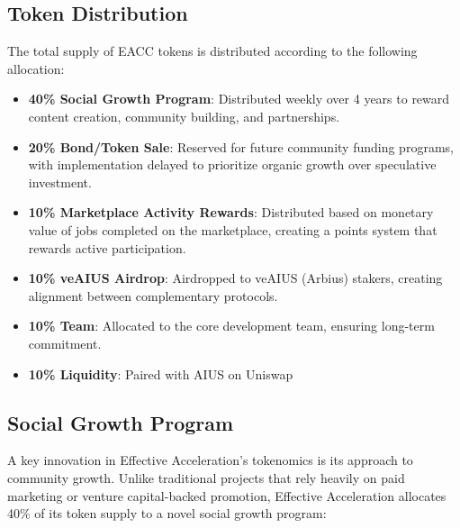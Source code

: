 \documentclass{article}
\begin{document}
\subsection{Token Distribution}

The total supply of EACC tokens is distributed according to the following allocation:

\begin{itemize}
    \item \textbf{40\% Social Growth Program}: Distributed weekly over 4 years to reward content creation, community building, and partnerships.
    
    \item \textbf{20\% Bond/Token Sale}: Reserved for future community funding programs, with implementation delayed to prioritize organic growth over speculative investment.
    
    \item \textbf{10\% Marketplace Activity Rewards}: Distributed based on monetary value of jobs completed on the marketplace, creating a points system that rewards active participation.
    
    \item \textbf{10\% veAIUS Airdrop}: Airdropped to veAIUS (Arbius) stakers, creating alignment between complementary protocols.
    
    \item \textbf{10\% Team}: Allocated to the core development team, ensuring long-term commitment.
    
    \item \textbf{10\% Liquidity}: Paired with AIUS on Uniswap
\end{itemize}

\subsection{Social Growth Program}

A key innovation in Effective Acceleration's tokenomics is its approach to community growth. Unlike traditional projects that rely heavily on paid marketing or venture capital-backed promotion, Effective Acceleration allocates 40\% of its token supply to a novel social growth program:
\end{document}
